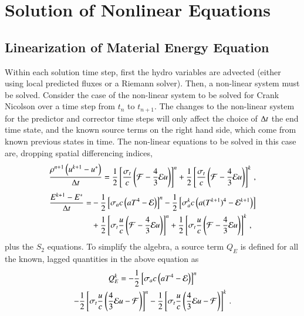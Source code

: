 \section{Solution of Nonlinear Equations}
\subsection{Linearization of Material Energy Equation}

Within each solution time step, first the hydro variables are advected (either
using local predicted fluxes or a Riemann solver).  Then, a non-linear system
must be solved.  Consider the case of the non-linear system to be solved for
Crank Nicolson over a time step from $t_n$ to $t_{n+1}$.  The changes to the
non-linear system for the predictor and corrector time steps will only affect
the choice of $\Delta t$ the end time state, and the known source terms on the right
hand side, which come from known previous states in time.  The non-linear
equations to be solved in this case are, dropping spatial differencing indices,
\begin{equation}
  \frac{\rho^{n+1}\left(u^{k+1}-u^*\right)}{\Delta t} = 
   \frac{1}{2}\left[\frac{\sigma_{t}}{c}\left(\mathcal{F}-\frac{4}{3}\mathcal{E} u\right)\right]^n
  +\frac{1}{2}\left[\frac{\sigma_{t}}{c}\left(\mathcal{F}-\frac{4}{3}\mathcal{E} u\right)\right]^k
  \, ,
\label{eq:vel_update}
\end{equation}
\begin{equation}\begin{split}
  \frac{E^{k+1}-E^*}{\Delta t} = &
  -\frac{1}{2}\left[\sigma_{a} c\left(aT^4 - \mathcal{E}\right)\right]^n
  -\frac{1}{2}\left[\sigma_{a}^k c\left(a(T^{k+1})^4 - \mathcal{E}^{k+1}\right)\right]\\
  &+\frac{1}{2}\left[\sigma_{t}\frac{u}{c}\left(\mathcal{F}-\frac{4}{3}\mathcal{E} u\right)\right]^n
   +\frac{1}{2}\left[\sigma_{t}\frac{u}{c}\left(\mathcal{F}-\frac{4}{3}\mathcal{E} u\right)\right]^k
  \, ,
\label{eq:mat}
\end{split}\end{equation}
plus the $S_2$ equations.  To simplify the algebra, a source term $Q_E$ is
defined for all the known, lagged quantities in the above equation as
\begin{multline}
   Q_E^{k} = -\frac{1}{2}\left[\sigma_a c\left( aT^4 - \mathcal{E}\right)\right]^n\\
   -\frac{1}{2}\left[\sigma_t \frac{u}{c} \left( \frac{4}{3} \mathcal{E} u - \mathcal{F} \right)\right]^n - \frac{1}{2}\left[\sigma_t \frac{u}{c} \left( \frac{4}{3} \mathcal{E} u - \mathcal{F} \right)\right]^k \, .
\end{multline}
